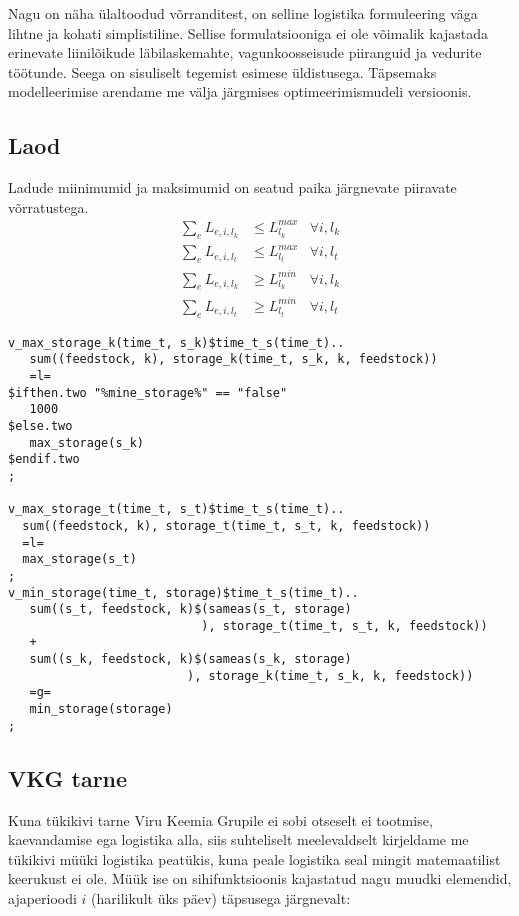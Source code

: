 \documentclass[10pt,a4paper]{article}
\begin{document}
Nagu on näha ülaltoodud võrranditest, on selline logistika formuleering väga lihtne ja kohati simplistiline. Sellise formulatsiooniga ei ole võimalik kajastada erinevate liinilõikude läbilaskemahte, vagunkoosseisude piiranguid ja vedurite töötunde. Seega on sisuliselt tegemist esimese üldistusega. Täpsemaks modelleerimise arendame me välja järgmises optimeerimismudeli versioonis.

\subsection{Laod}
Ladude miinimumid ja maksimumid on seatud paika järgnevate piiravate võrratustega.
\begin{align}
\sum_e L_{e,i,l_k} & \leq L^{max}_{l_k} &\forall i,l_k \\
\sum_e L_{e,i,l_t} & \leq L^{max}_{l_t} &\forall i,l_t \\
\sum_e L_{e,i,l_k} & \geq L^{min}_{l_k} &\forall i,l_k \\
\sum_e L_{e,i,l_t} & \geq L^{min}_{l_t} &\forall i,l_t
\end{align}
\begin{verbatim}
v_max_storage_k(time_t, s_k)$time_t_s(time_t)..
   sum((feedstock, k), storage_k(time_t, s_k, k, feedstock))
   =l=
$ifthen.two "%mine_storage%" == "false"
   1000
$else.two
   max_storage(s_k)
$endif.two
;

v_max_storage_t(time_t, s_t)$time_t_s(time_t)..
  sum((feedstock, k), storage_t(time_t, s_t, k, feedstock))
  =l=
  max_storage(s_t)
;
v_min_storage(time_t, storage)$time_t_s(time_t)..
   sum((s_t, feedstock, k)$(sameas(s_t, storage)
                           ), storage_t(time_t, s_t, k, feedstock))
   +
   sum((s_k, feedstock, k)$(sameas(s_k, storage)
                         ), storage_k(time_t, s_k, k, feedstock))
   =g=
   min_storage(storage)
;
\end{verbatim}

\subsection{VKG tarne}
Kuna tükikivi tarne Viru Keemia Grupile ei sobi otseselt ei tootmise, kaevandamise ega logistika alla, siis suhteliselt meelevaldselt kirjeldame me tükikivi müüki logistika peatükis, kuna peale logistika seal mingit matemaatilist keerukust ei ole. Müük ise on sihifunktsioonis kajastatud nagu muudki elemendid, ajaperioodi $i$ (harilikult üks päev) täpsusega järgnevalt:
\end{document}
